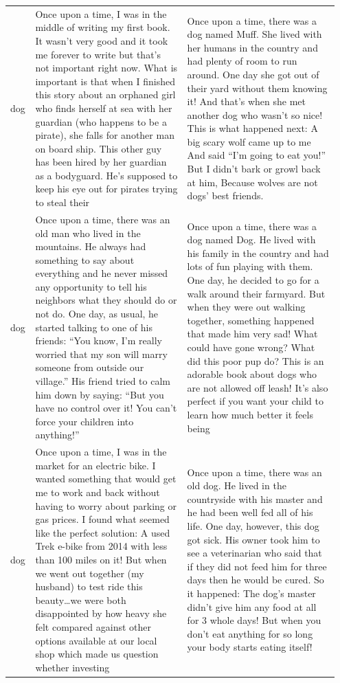 \documentclass{article}
\theoremstyle{plain}
\theoremstyle{definition}
\theoremstyle{remark}
\begin{document}
\begin{table}[t]
\begin{tabular}{p{0.05\linewidth} p{0.45\linewidth} p{0.45\linewidth}}
dog & Once upon a time, I was in the middle of writing my first book. It wasn’t very good and it took me forever to write but that’s not important right now.
What is important is that when I finished this story about an orphaned girl who finds herself at sea with her guardian (who happens to be a pirate), she falls for another man on board ship. This other guy has been hired by her guardian as a bodyguard. He’s supposed to keep his eye out for pirates trying to steal their & Once upon a time, there was a dog named Muff. She lived with her humans in the country and had plenty of room to run around.
One day she got out of their yard without them knowing it! And that’s when she met another dog who wasn’t so nice!
This is what happened next: A big scary wolf came up to me And said “I’m going to eat you!” But I didn’t bark or growl back at him, Because wolves are not dogs’ best friends.\\
\addlinespace
 
dog & Once upon a time, there was an old man who lived in the mountains. He always had something to say about everything and he never missed any opportunity to tell his neighbors what they should do or not do.
One day, as usual, he started talking to one of his friends: “You know, I’m really worried that my son will marry someone from outside our village.” His friend tried to calm him down by saying: “But you have no control over it! You can’t force your children into anything!” & Once upon a time, there was a dog named Dog. He lived with his family in the country and had lots of fun playing with them.
One day, he decided to go for a walk around their farmyard. But when they were out walking together, something happened that made him very sad!
What could have gone wrong? What did this poor pup do?
This is an adorable book about dogs who are not allowed off leash! It’s also perfect if you want your child to learn how much better it feels being \\
\addlinespace

dog & Once upon a time, I was in the market for an electric bike. I wanted something that would get me to work and back without having to worry about parking or gas prices.
I found what seemed like the perfect solution: A used Trek e-bike from 2014 with less than 100 miles on it! But when we went out together (my husband) to test ride this beauty…we were both disappointed by how heavy she felt compared against other options available at our local shop which made us question whether investing & Once upon a time, there was an old dog. He lived in the countryside with his master and he had been well fed all of his life.
One day, however, this dog got sick. His owner took him to see a veterinarian who said that if they did not feed him for three days then he would be cured. So it happened: The dog’s master didn’t give him any food at all for 3 whole days! But when you don’t eat anything for so long your body starts eating itself!\\


\end{tabular}
\end{table}
\end{document}
